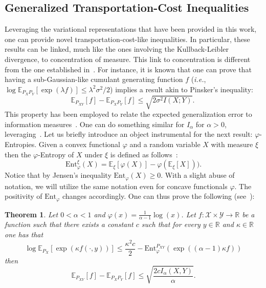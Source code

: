 \documentclass{article}
\newtheorem{theorem}{Theorem}
\numberwithin{theorem}{section}
\numberwithin{example}{section}
\numberwithin{remark}{section}
\numberwithin{definition}{section}
\newcommand{\E}{\mathbb{E}}
\newcommand{\X}{\mathcal{X}}
\newcommand{\Y}{\mathcal{Y}}
\begin{document}
\subsection{Generalized Transportation-Cost Inequalities}\label{sec:tpcSibson}
Leveraging the variational representations that have been provided in this work, one can provide novel transportation-cost-like inequalities. In particular, these results can be linked, much like the ones involving the Kullback-Leibler divergence, to concentration of measure. This link to concentration is different from the one established in~.
 For instance, it is known that one can prove that having a sub-Gaussian-like cumulant generating function $f$ (\textit{i.e.},  $
\log\E_{P_XP_Y}[\exp(\lambda f)]\leq \lambda^2\sigma^2/2$) implies a result akin to Pinsker's inequality:
\begin{equation}
    \E_{P_{XY}}[f]-\E_{P_XP_Y}[f] \leq \sqrt{2\sigma^2 I(X;Y)}.~\label{eq:tpcIneq}
\end{equation}
This property has been employed to relate the expected generalization error to information measures~\cite{XuR:17,EspositoG:22}. One can do something similar for $I_\alpha$ for $\alpha>0$, leveraging~. 
Let us briefly introduce an object instrumental for the next result: $\varphi$-Entropies. Given a convex functional $\varphi$ and a random variable $X$ with measure $\xi$ then the $\varphi$-Entropy of $X$ under $\xi$ is defined as follows~\cite{Chafai:04}:
\begin{equation}
    \text{Ent}^\xi_\varphi(X)= \E_{\xi}[\varphi(X)] - \varphi(\E_{\xi}[X])).
\end{equation}
Notice that by Jensen's inequality $\text{Ent}_\varphi(X)\geq 0$. With a slight abuse of notation, we will utilize the same notation even for concave functionals $\varphi$. The positivity of $\text{Ent}_\varphi$ changes accordingly.
One can thus prove the following (see~):
\begin{theorem}\label{thm:TpcIneqIalpha}
    Let $0<\alpha<1$ and $\varphi(x)=\frac{1}{\alpha-1}\log(x)$.
    Let $f:\X\times\Y\to\mathbb{R}$ be a function such that there exists a constant $c$ such that for every $y\in\mathbb{R}$ and $\kappa\in\mathbb{R}$ one has that
    \begin{equation}
        \log\E_{P_X}[\exp(\kappa f(\cdot, y))] \leq \frac{\kappa^2 c}{2} - \text{Ent}^{P_{XY}}_\varphi(\exp((\alpha-1)\kappa f))\label{eq:subGaussGener}
    \end{equation}
    then
    \begin{equation}
         \E_{P_{XY}}[f]-\E_{P_XP_Y}[f] \leq \sqrt{\frac{2cI_\alpha(X,Y)}{\alpha}}.\label{eq:tcpIneqIalpha}
    \end{equation}
\end{theorem}
\end{document}
